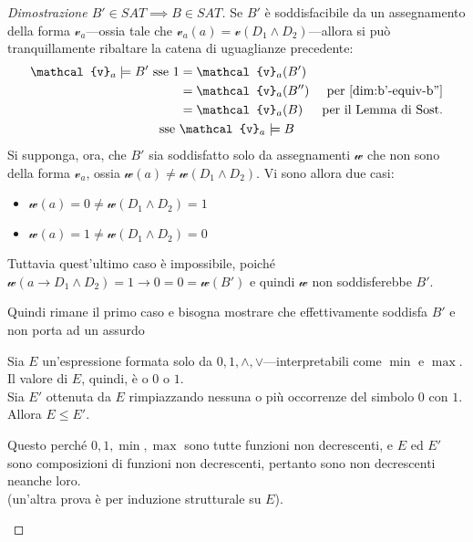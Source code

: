 \begin{proof}[Dimostrazione $B' \in SAT \implies B \in SAT$]
        Se $B'$ è soddisfacibile da un assegnamento della forma $\mathcal{v}_a$—ossia tale che $\mathcal{v}_a(a) = \mathcal{v}(D_1 \land D_2)$—allora si può tranquillamente ribaltare la catena di uguaglianze precedente: 
        \begin{align*}
          \mathcal{v}_a \models B' \text{ sse }1 &= \mathcal{v}_a(B') \\
          &= \mathcal{v}_a(B'') & \text{per~\ref{dim:b'-equiv-b''}}  \\
          &= \mathcal{v}_a(B) & \text{per il Lemma di Sost.} \\
          \text{sse } & \mathcal{v}_a \models B
        \end{align*}
        Si supponga, ora, che $B'$ sia soddisfatto solo da assegnamenti $\mathcal{w}$ che non sono della forma $\mathcal{v}_a$, ossia $\mathcal{w}(a) \neq \mathcal{w}(D_1 \land D_2)$. Vi sono allora due casi:
        \begin{itemize}
          \item $\mathcal{w}(a) = 0 \neq \mathcal{w}(D_1 \land D_2) = 1$
          \item $\mathcal{w}(a) = 1 \neq \mathcal{w}(D_1 \land D_2) = 0$
        \end{itemize}
        Tuttavia quest'ultimo caso è impossibile, poiché $\mathcal{w}(a \rightarrow D_1 \land D_2) = 1 \rightarrow 0 = 0 = \mathcal{w}(B')$ e quindi $\mathcal{w}$ non soddisferebbe $B'$.
        
        Quindi rimane il primo caso e bisogna mostrare che effettivamente soddisfa $B'$ e non porta ad un assurdo
        
        \begin{oss}
        Sia $E$ un'espressione formata solo da $0, 1, \land, \lor$—interpretabili come $\min$ e $\max$. Il valore di $E$, quindi, è o $0$ o $1$. \\
        Sia $E'$ ottenuta da $E$ rimpiazzando nessuna o più occorrenze  del simbolo $0$ con $1$. \\
        Allora $E \leq E'$.
        
        Questo perché $0, 1, \min, \max$ sono tutte funzioni non decrescenti, e $E$ ed $E'$ sono composizioni di funzioni non decrescenti, pertanto sono non decrescenti neanche loro. \\
        (un'altra prova è per induzione strutturale su $E$).
        \end{oss}


\end{proof}
